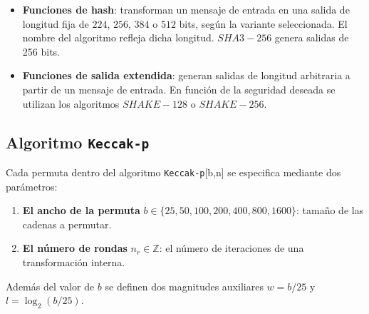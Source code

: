 \begin{itemize}
	\item \textbf{Funciones de hash}: transforman un mensaje de entrada en una salida de longitud fija de $224$, $256$, $384$ o $512$ bits, según la variante seleccionada. El nombre del algoritmo refleja dicha longitud. $SHA3-256$ genera salidas de 256 bits.
	\item \textbf{Funciones de salida extendida}: generan salidas de longitud arbitraria a partir de un mensaje de entrada. En función de la seguridad deseada se utilizan los algoritmos $SHAKE-128$ o $SHAKE-256$.
\end{itemize}
\subsection{Algoritmo \texttt{Keccak-p}}
Cada permuta dentro del algoritmo \texttt{Keccak-p}[b,n] se especifica mediante dos parámetros: 
\begin{enumerate}
	\item \textbf{El ancho de la permuta} \(b \in\{25, 50, 100, 200, 400, 800, 1600\}\): tamaño de las cadenas a permutar.
	\item \textbf{El número de rondas} \(n_r\in \mathbb{Z}\): el número de iteraciones de una transformación interna. 
\end{enumerate}
Además del valor de \(b\) se definen dos magnitudes auxiliares \(w=b/25\) y \(l=\log_2(b/25)\).

